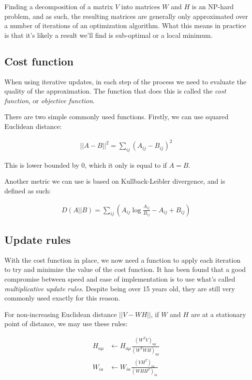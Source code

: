 Finding a decomposition of a matrix $V$ into matrices $W$ and $H$ is an NP-hard problem, and as such, the resulting matrices are generally only approximated over a number of iterations of an optimization algorithm. What this means in practice is that it's likely a result we'll find is sub-optimal or a local minimum.

\subsection{Cost function}
When using iterative updates, in each step of the process we need to evaluate the quality of the approximation. The function that does this is called the \emph{cost function}, or \emph{objective function}.

There are two simple commonly used functions. Firstly, we can use squared Euclidean distance: \cite{pentti_pmf_1997}

\begin{align}
||A-B||^2 = \sum_{ij}(A_{ij} - B_{ij})^2
\end{align}

This is lower bounded by 0, which it only is equal to if $A = B$.

Another metric we can use is based on Kullback-Leibler divergence, and is defined as such: \cite{nmf_algorithms}

\begin{align}
D(A||B) = \sum_{ij} \left( A_{ij} \log \frac{A_{ij}}{B_{ij}} - A_{ij} + B_{ij} \right)
\end{align}

\subsection{Update rules}
With the cost function in place, we now need a function to apply each iteration to try and minimize the value of the cost function. It has been found that a good compromise between speed and ease of implementation is to use what's called \emph{multiplicative update rules}. \cite{nmf_algorithms} Despite being over 15 years old, they are still very commonly used exactly for this reason.

For non-increasing Euclidean distance $||V - WH||$, if $W$ and $H$ are at a stationary point of distance, we may use these rules:

\begin{align}
H_{a \mu} & \leftarrow H_{a \mu} \frac{(W^TV)_{a \mu}}{(W^TWH)_{a \mu}} \\
W_{ia} & \leftarrow W_{ia} \frac{(VH^T)_{ia}}{(WHH^T)_{ia}}
\end{align}

